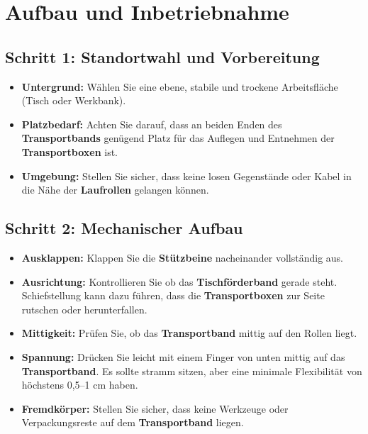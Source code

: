 %
%

\chapter{Aufbau und Inbetriebnahme}

\section{Schritt 1: Standortwahl und Vorbereitung}

\begin{itemize}
	\item \textbf{Untergrund:} Wählen Sie eine ebene, stabile und trockene Arbeitsfläche (Tisch oder Werkbank).
	
	\item \textbf{Platzbedarf:} Achten Sie darauf, dass an beiden Enden des \textbf{Transportbands} genügend Platz für das Auflegen und Entnehmen der \textbf{Transportboxen} ist.
	
	\item \textbf{Umgebung:} Stellen Sie sicher, dass keine losen Gegenstände oder Kabel in die Nähe der \textbf{Laufrollen} gelangen können.

\end{itemize}

\section{Schritt 2: Mechanischer Aufbau}

\begin{itemize}
	\item \textbf{Ausklappen:} Klappen Sie die \textbf{Stützbeine} nacheinander vollständig aus.
	
	\item \textbf{Ausrichtung:} Kontrollieren Sie ob das \textbf{Tischförderband} gerade steht. Schiefstellung kann dazu führen, dass die \textbf{Transportboxen} zur Seite rutschen oder herunterfallen.
	
	\item \textbf{Mittigkeit:} Prüfen Sie, ob das \textbf{Transportband} mittig auf den Rollen liegt.
	
	\item \textbf{Spannung:} Drücken Sie leicht mit einem Finger von unten mittig auf das \textbf{Transportband}. Es sollte stramm sitzen, aber eine minimale Flexibilität von höchstens  0,5--1 cm haben.
	
	
	\item \textbf{Fremdkörper:} Stellen Sie sicher, dass keine Werkzeuge oder Verpackungsreste auf dem \textbf{Transportband} liegen.
	
\end{itemize}

